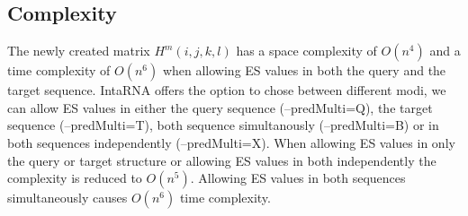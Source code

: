 \documentclass[11pt,a4paper]{report}
\begin{document}
\subsection*{Complexity}
The newly created matrix $H^m(i,j,k,l)$ has a space complexity of $O(n^4)$ and a time complexity of $O(n^6)$ when allowing ES values in both the query and the target sequence. IntaRNA offers the option to chose between different modi, we can allow ES values in either the query sequence (--predMulti=Q), the target sequence (--predMulti=T), both sequence simultanously (--predMulti=B) or in both sequences independently (--predMulti=X). When allowing ES values in only the query or target structure or allowing ES values in both independently the complexity is reduced to $O(n^5)$. Allowing ES values in both sequences simultaneously causes $O(n^6)$ time complexity.\\
\end{document}
